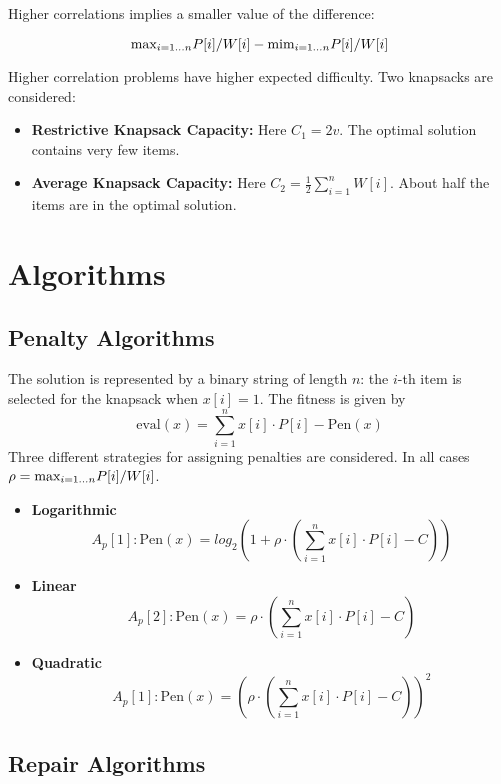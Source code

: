 \documentclass[../main.tex]{subfiles}
\begin{document}
Higher correlations implies a smaller value of the difference:

\begin{equation}
\text{max}_{i=1 \mathellipsis n} { P[i]/W[i]} - \text{mim}_{i=1 \mathellipsis n} { P[i]/W[i]}
\end{equation}

Higher correlation problems have higher expected difficulty. Two knapsacks are considered:

\begin{itemize}
	\item \textbf{Restrictive Knapsack Capacity:} Here $C_1 = 2v$. The optimal solution contains very few items.
	\item \textbf{Average Knapsack Capacity:} Here $C_2 = \frac{1}{2} \sum^n_{i=1}W[i]$. About half the items are in
	the optimal solution.
\end{itemize}

\section{Algorithms}

\subsection{Penalty Algorithms}

The solution is represented by a binary string of length $n$: the $i$-th item is selected for the knapsack when $x[i] =
1$. The fitness is given by
\begin{equation}
\text{eval}(x) = \sum^n_{i=1} x[i] \cdot P[i] - \text{Pen}(x)
\end{equation}
Three different strategies for assigning penalties are considered. In all cases $\rho = \text{max}_{i=1 \mathellipsis
n} { P[i]/W[i]}$.

\begin{itemize}
	\item \textbf{Logarithmic} \\
	\[
	A_p[1]: \text{Pen}(x) = log_2(1 + \rho \cdot (\sum^n_{i=1} x[i] \cdot P[i] - C))
	\]
	\item \textbf{Linear}
	\[
	A_p[2]: \text{Pen}(x) = \rho \cdot (\sum^n_{i=1} x[i] \cdot P[i] - C)
	\]
	\item \textbf{Quadratic}
	\[
	A_p[1]: \text{Pen}(x) = (\rho \cdot (\sum^n_{i=1} x[i] \cdot P[i] - C))^2
	\]
\end{itemize}


\subsection{Repair Algorithms}
\end{document}
